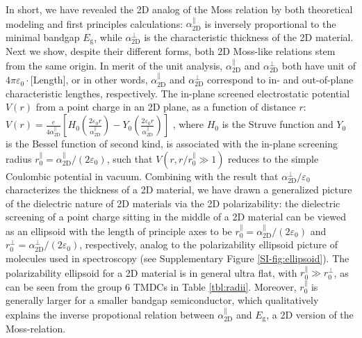 \documentclass[journal=ancac3,manuscript=article,email=true,hyperref=true,keywords=false]{achemso}
\begin{document}
In short, we have revealed the 2D analog of the Moss relation by both
theoretical modeling and first principles calculations:
$\alpha_{\mathrm{2D}}^{\parallel}$ is inversely proportional to the
minimal bandgap $E_{\mathrm{g}}$, while $\alpha_{\mathrm{2D}}^{\perp}$
is the characteristic thickness of the 2D material. Next we show,
despite their different forms, both 2D Moss-like relations stem from
the same origin. In merit of the unit analysis,
$\alpha_{\mathrm{2D}}^{\parallel}$ and $\alpha_{\mathrm{2D}}^{\perp}$
both have unit of $4\pi\varepsilon_{0} \cdot$[Length], or in other
words, $\alpha_{\mathrm{2D}}^{\parallel}$ and
$\alpha_{\mathrm{2D}}^{\perp}$ correspond to in- and out-of-plane
characteristic lengthes, respectively. The in-plane screened
electrostatic potential $V(r)$ from a point charge in an 2D plane, as
a function of distance $r$:
$V(r) = {\displaystyle \frac{e}{4 \alpha_{\mathrm{2D}}^{\parallel}}}
\left[H_{0}({\displaystyle \frac{2\varepsilon_{0}
      r}{\alpha_{\mathrm{2D}}^{\parallel}}}) - Y_{0}( {\displaystyle
    \frac{2
      \varepsilon_{0}r}{\alpha_{\mathrm{2D}}^{\parallel}}})\right]$
\cite{Keldysh_1979_eps_multi,Pulci_2014}, where $H_{0}$ is the Struve
function and $Y_{0}$ is the Bessel function of second kind, is
associated with the in-plane screening radius
$r_{0}^{\parallel}=\alpha_{\mathrm{2D}}^{\parallel}/(2
\varepsilon_{0})$, such that $V(r,r/r^{\parallel}_{0} \gg 1)$ reduces
to the simple Coulombic potential in vacuum. Combining with the result
that $\alpha_{\mathrm{2D}}^{\perp}/\varepsilon_{0}$ characterizes the
thickness of a 2D material, we have drawn a generalized picture of the
dielectric nature of 2D materials via the 2D polarizability: the
dielectric screening of a point charge sitting in the middle of a 2D
material can be viewed as an ellipsoid with the length of principle
axes to be
$r_{0}^{\parallel} = \alpha_{\mathrm{2D}}^{\parallel}/(2
\varepsilon_{0})$ and
$r_{0}^{\perp} = \alpha^{\perp}_{\mathrm{2D}}/(2 \varepsilon_{0})$,
respectively, analog to the polarizability ellipsoid picture of
molecules used in spectroscopy \cite{Banwell_1994} (see Supplementary
Figure \ref{SI-fig:ellipsoid}). The polarizability ellipsoid for a 2D
material is in general ultra flat, with
$r_{0}^{\parallel} \gg r_{0}^{\perp}$, as can be seen from the group 6
TMDCs in Table \ref{tbl:radii}.  Moreover,
$r_{0}^{\parallel}$ is generally larger for a smaller bandgap
semiconductor, which qualitatively explains the inverse propotional
relation between $\alpha_{\mathrm{2D}}^{\parallel}$ and
$E_{\mathrm{g}}$, a 2D version of the Moss-relation.
\end{document}
